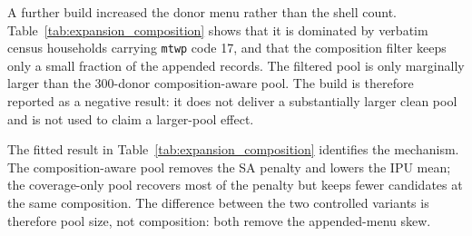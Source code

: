 A further build increased the donor menu rather than the shell count.
Table~\ref{tab:expansion_composition} shows that it is dominated by verbatim
census households carrying \texttt{mtwp} code 17, and that the composition
filter keeps only a small fraction of the appended records. The filtered pool is
only marginally larger than the 300-donor composition-aware pool. The build is
therefore reported as a negative result: it does not deliver a substantially
larger clean pool and is not used to claim a larger-pool effect.

The fitted result in Table~\ref{tab:expansion_composition} identifies the
mechanism. The composition-aware pool removes the SA penalty and lowers the IPU
mean; the coverage-only pool recovers most of the penalty but keeps fewer
candidates at the same composition. The difference between the two controlled
variants is therefore pool size, not composition: both remove the appended-menu
skew.
